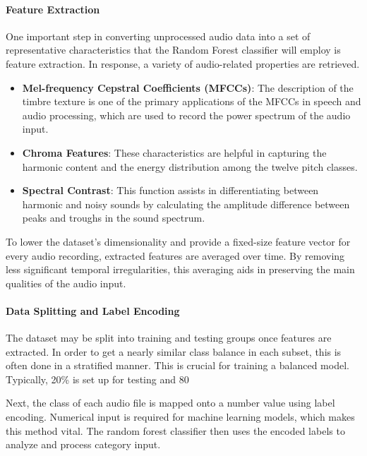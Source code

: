 \documentclass[conference]{IEEEtran}
\begin{document}
\paragraph{Feature Extraction}
One important step in converting unprocessed audio data into a set of representative characteristics that the Random Forest classifier will employ is feature extraction. In response, a variety of audio-related properties are retrieved.

\begin{itemize}
    \item \textbf{Mel-frequency Cepstral Coefficients (MFCCs)}: The description of the timbre texture is one of the primary applications of the MFCCs in speech and audio processing, which are used to record the power spectrum of the audio input.

    \item \textbf{Chroma Features}: These characteristics are helpful in capturing the harmonic content and the energy distribution among the twelve pitch classes.


    \item \textbf{Spectral Contrast}: This function assists in differentiating between harmonic and noisy sounds by calculating the amplitude difference between peaks and troughs in the sound spectrum.

\end{itemize}

To lower the dataset's dimensionality and provide a fixed-size feature vector for every audio recording, extracted features are averaged over time. By removing less significant temporal irregularities, this averaging aids in preserving the main qualities of the audio input.


\paragraph{Data Splitting and Label Encoding}

The dataset may be split into training and testing groups once features are extracted. In order to get a nearly similar class balance in each subset, this is often done in a stratified manner. This is crucial for training a balanced model. Typically, 20\% is set up for testing and 80%


Next, the class of each audio file is mapped onto a number value using label encoding. Numerical input is required for machine learning models, which makes this method vital. The random forest classifier then uses the encoded labels to analyze and process category input.
\end{document}
